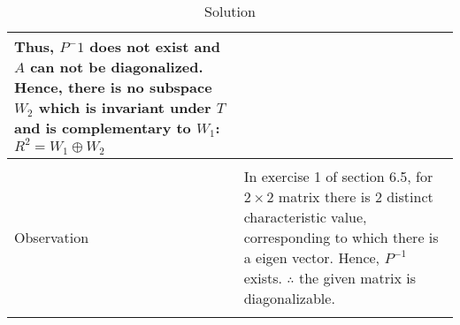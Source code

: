 \begin{longtable}{|p{5cm}|p{13cm}|}
{ Thus, $P^-1$ does not exist and $A$ can not be diagonalized.\\ Hence, there is no subspace $W_2$ which is invariant under $T$ and is complementary to $W_1$:\\
$R^2=W_1\oplus W_2$\\}\\
\hline
& \\
Observation & 
\parbox{12cm}{In exercise 1 of section 6.5, for $2\times 2$ matrix there is 2 distinct characteristic value, corresponding to which there is a eigen vector. Hence, $P^{-1}$ exists. \\
$\therefore$ the given matrix is diagonalizable.\\}\\
\hline
\caption{Solution}
\label{eq:solutions/6/7/2/tab:sol}
\end{longtable}
\twocolumn
